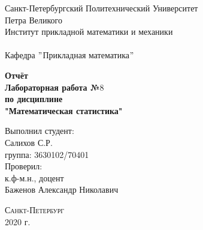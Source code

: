 \documentclass[a4]{article}
\begin{document}
	\def\contentsname{\LARGE{Содержание}}
	\thispagestyle{empty}
	\begin{center} 
		\vspace{2cm} 
		{\Large \sc Санкт-Петербургский Политехнический Университет}\\
		\vspace{2mm}
		{\Large\sc Петра Великого}\\
		\vspace{1cm}
		{\large \sc Институт прикладной математики и механики\\ 
			\vspace{0.5mm}
			\textsc{}}\\ 
		\vspace{0.5mm}
		{\large\sc Кафедра $"$Прикладная математика$"$}\\
		\vspace{15mm}
		
		
		{\sc \textbf{Отчёт\\
			Лабораторная работа №$8$\\
			по дисциплине\\
			"Математическая статистика"}
			\vspace{6mm}
			
		}
		\vspace*{2mm}
		
		
		\begin{flushleft}
			\vspace{4cm}
			\sc Выполнил студент:\\
			\sc Салихов С.Р.\\
			\sc группа: 3630102/70401\\
			\vspace{1cm}
			\sc Проверил:\\
			\sc к.ф-м.н., доцент\\
			\sc Баженов Александр Николавич
			\vspace{20mm}
		\end{flushleft}
	\end{center} 
	\begin{center}
		\vfill {\large\textsc{Санкт-Петербург}}\\ 
		2020 г.
	\end{center}
	
	\newpage
	\pagestyle{plain}
	
	
	
\end{document}
